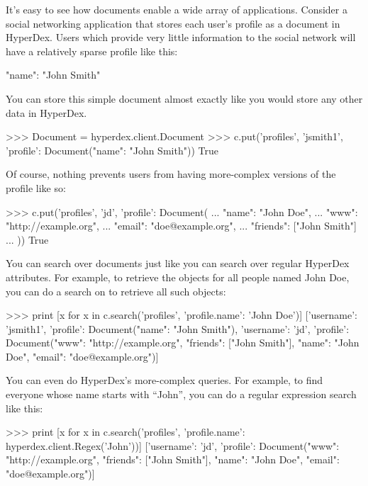 It's easy to see how documents enable a wide array of applications.  Consider a
social networking application that stores each user's profile as a document in
HyperDex.  Users which provide very little information to the social network
will have a relatively sparse profile like this:

\begin{jsoncode}
{"name": "John Smith"}
\end{jsoncode}

You can store this simple document almost exactly like you would store any other
data in HyperDex.

\begin{pythoncode}
>>> Document = hyperdex.client.Document
>>> c.put('profiles', 'jsmith1', {'profile': Document({"name": "John Smith"})})
True
\end{pythoncode}

Of course, nothing prevents users from having more-complex versions of the
profile like so:

\begin{pythoncode}
>>> c.put('profiles', 'jd', {'profile': Document({
...     "name": "John Doe",
...     "www": "http://example.org",
...     "email": "doe@example.org",
...     "friends": ["John Smith"]
... })})
True
\end{pythoncode}

You can search over documents just like you can search over regular HyperDex
attributes.  For example, to retrieve the objects for all people named John Doe,
you can do a search on  to retrieve all such objects:

\begin{pythoncode}
>>> print [x for x in c.search('profiles', {'profile.name': 'John Doe'})]
[{'username': 'jsmith1', 'profile': Document({"name": "John Smith"})}, {'username': 'jd', 'profile': Document({"www": "http://example.org", "friends": ["John Smith"], "name": "John Doe", "email": "doe@example.org"})}]
\end{pythoncode}

You can even do HyperDex's more-complex queries.  For example, to find everyone
whose name starts with ``John'', you can do a regular expression search like
this:

\begin{pythoncode}
>>> print [x for x in c.search('profiles', {'profile.name': hyperdex.client.Regex('John')})]
[{'username': 'jd', 'profile': Document({"www": "http://example.org", "friends":
["John Smith"], "name": "John Doe", "email": "doe@example.org"})}]
\end{pythoncode}

